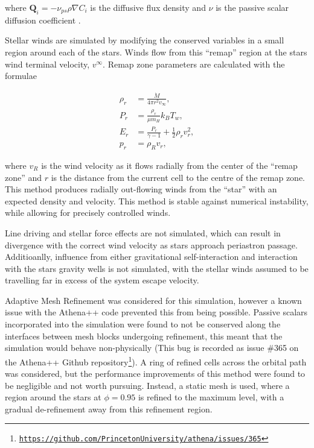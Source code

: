 where $\mathbf{Q}_i = - \nu_{ps} \rho \nabla C_i$ is the diffusive flux density and $\nu$ is the passive scalar diffusion coefficient \parencite{stoneAthenaAdaptiveMesh2020}.


Stellar winds are simulated by modifying the conserved variables in a small region around each of the stars.
Winds flow from this ``remap'' region at the stars wind terminal velocity, $v^\infty$. Remap zone parameters are calculated with the formulae

\begin{subequations}
  \begin{align}
    \rho_r & = \frac{\dot M}{4 \pi r^2 v_\infty} , \\
    P_r    & = \frac{\rho_r}{\mu m_H} k_B T_w , \\
    E_r    & = \frac{P_r}{\gamma - 1} + \frac{1}{2} \rho_{r} v_{r}^2 , \\
    p_{r}  & = \rho_R v_{r} , 
  \end{align}
\end{subequations}

\noindent
where $v_R$ is the wind velocity as it flows radially from the center of the ``remap zone'' and $r$ is the distance from the current cell to the centre of the remap zone.
This method produces radially out-flowing winds from the ``star'' with an expected density and velocity.
This method is stable against numerical instability, while allowing for precisely controlled winds.

Line driving and stellar force effects are not simulated, which can result in divergence with the correct wind velocity as stars approach periastron passage.
Additioanlly, influence from either gravitational self-interaction and interaction with the stars gravity wells is not simulated, with the stellar winds assumed to be travelling far in excess of the system escape velocity.

Adaptive Mesh Refinement was considered for this simulation, however a known issue with the Athena++ code prevented this from being possible.
Passive scalars incorporated into the simulation were found to not be conserved along the interfaces between mesh blocks undergoing refinement, this meant that the simulation would behave non-physically (This bug is recorded as issue \#365 on the Athena++ Github repository\footnote{\texttt{\href{https://github.com/PrincetonUniversity/athena/issues/365.}{https://github.com/PrincetonUniversity/athena/issues/365}}}).
A ring of refined cells across the orbital path was considered, but the performance improvements of this method were found to be negligible and not worth pursuing.
Instead, a static mesh is used, where a region around the stars at $\phi = 0.95$ is refined to the maximum level, with a gradual de-refinement away from this refinement region.

